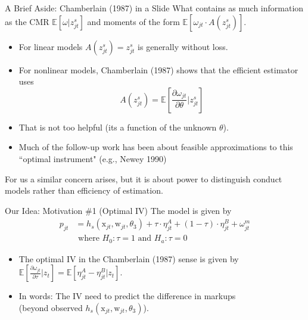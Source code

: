 \documentclass[xcolor=pdftex,dvipsnames,table,mathserif,aspectratio=169]{beamer}
\begin{document}
\begin{frame}[plain,label=chamberlain]{A Brief Aside: Chamberlain (1987) in a Slide}
What contains as much information as the CMR $\mathbb{E}[\omega|z_{jt}^s]$ and moments of the form $ \mathbb{E}[\omega_{jt}\cdot A(z_{jt}^s)]. $
\begin{itemize}
\item For linear models $A(z_{jt}^s) = z_{jt}^s$ is generally without loss.
\item For nonlinear models, Chamberlain (1987) shows that the efficient estimator uses
$$A(z_{jt}^s) = \mathbb{E}\left[\frac{\partial \omega_{jt}}{\partial \theta}|z_{jt}^s\right]$$
\item That is not too helpful (its a function of the unknown $\theta$).
\item Much of the follow-up work has been about feasible approximations to this ``optimal instrument" (e.g., Newey 1990)
\end{itemize}
For us a similar concern arises, but it is about \alert{power} to distinguish conduct models rather than \alert{efficiency} of estimation.
\end{frame}



\begin{frame}[plain,label=innovation]{Our Idea: Motivation \#1 (Optimal IV)}
The model is given by
\begin{align*}
p_{jt} &= h_s(\textrm{x}_{jt},\textrm{w}_{jt},\theta_3) + \tau \cdot \eta^A_{jt} + (1-\tau) \cdot \eta^B_{jt} + \omega^m_{jt}\\
& \text{  where  }  H_0: \tau=1 \text{ and } H_a: \tau = 0
\end{align*}

\begin{itemize}
\item The optimal IV in the Chamberlain (1987) sense is given by $\mathbb{E}\left[\frac{\partial \omega_{jt}}{\partial \tau}|z_{t} \right]= \mathbb{E}\left[\eta^A_{jt}-\eta_{jt}^B|z_{t}\right]$.
\item In words: The IV need to predict the \alert{difference in markups}\\ (beyond observed $h_s(\textrm{x}_{jt},\textrm{w}_{jt},\theta_3)$).
\end{itemize}
\end{frame}
\end{document}

